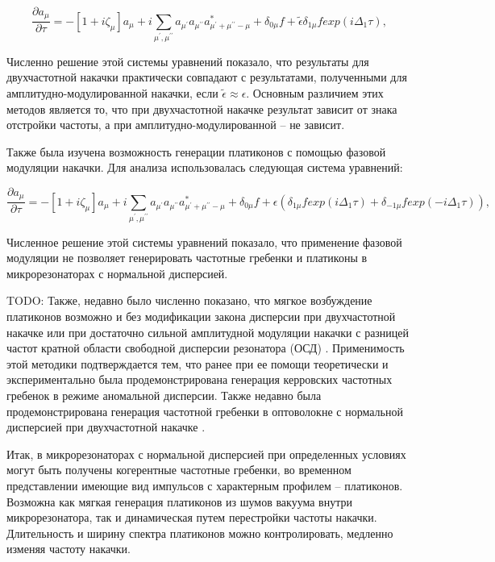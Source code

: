 \begin{equation}
\frac{\partial a_\mu}{\partial \tau}=-[1+i\zeta_{\mu}]a_\mu+i\sum_{\mu^\prime,\mu^{\prime\prime}} a_{\mu^\prime}a_{\mu^{\prime\prime}}a_{\mu^\prime+\mu^{\prime\prime}-\mu}^*+\delta_{0\mu}f+\tilde{\epsilon}\delta_{1\mu}f exp(i\Delta_1\tau),
\end{equation}

Численно решение этой системы уравнений показало, что результаты для двухчастотной накачки практически совпадают с результатами, полученными для амплитудно-модулированной накачки, если $\tilde{\epsilon}\approx\epsilon$. Основным различием этих методов является то, что при двухчастотной накачке результат зависит от знака отстройки частоты, а при амплитудно-модулированной – не зависит.

Также была изучена возможность генерации платиконов с помощью фазовой модуляции накачки. Для анализа использовалась
следующая система уравнений:

\begin{equation}
\frac{\partial a_\mu}{\partial \tau}=-[1+i\zeta_{\mu}]a_\mu+i\sum_{\mu^\prime,\mu^{\prime\prime}} a_{\mu^\prime}a_{\mu^{\prime\prime}}a_{\mu^\prime+\mu^{\prime\prime}-\mu}^*+\delta_{0\mu}f+\epsilon(\delta_{1\mu}f exp(i\Delta_1\tau)+\delta_{-1\mu}f exp(-i\Delta_1\tau)),
\end{equation}

Численное решение этой системы уравнений показало, что применение фазовой модуляции не позволяет генерировать частотные гребенки и платиконы в микрорезонаторах с нормальной дисперсией.


TODO: Также, недавно было численно показано, что мягкое возбуждение платиконов возможно и без модификации закона дисперсии при двухчастотной накачке или при достаточно сильной амплитудной модуляции накачки с разницей частот кратной области свободной дисперсии резонатора (ОСД) \cite{Lobanov2015epl}. Применимость этой методики подтверждается тем, что ранее при ее помощи теоретически \cite{Hansson2014} и экспериментально \cite{Strekalov2009} была продемонстрирована генерация керровских частотных гребенок в режиме аномальной дисперсии. Также недавно была продемонстрирована генерация частотной гребенки в оптоволокне с нормальной дисперсией при двухчастотной накачке \cite{Antikainen2015}.


Итак, в микрорезонаторах с нормальной дисперсией при определенных условиях могут быть получены когерентные частотные гребенки, во временном представлении имеющие вид импульсов с характерным профилем – платиконов. Возможна как мягкая генерация платиконов из шумов вакуума внутри микрорезонатора, так и динамическая путем перестройки частоты накачки. Длительность и ширину спектра платиконов можно контролировать, медленно изменяя частоту накачки.